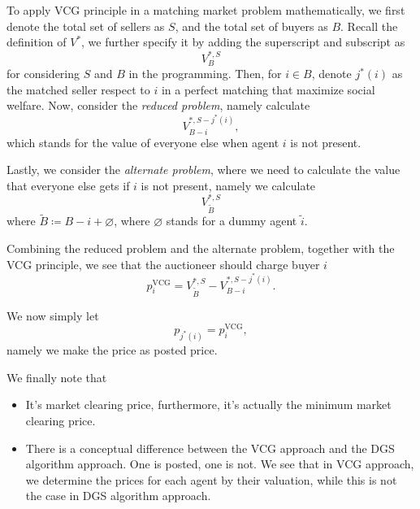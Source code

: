 To apply VCG principle in a matching market problem mathematically, we first denote the total set of sellers as \(S\), and the total set of buyers as \(B\). Recall
the definition of \(V^{\ast}\), we further specify it by adding the superscript and subscript as
\[
	V^{*, S}_{B}
\]
for considering \(S\) and \(B\) in the programming. Then, for \(i\in B\), denote \(j^{\ast} (i)\) as the matched seller respect to \(i\) in a perfect matching that
maximize social welfare. Now, consider the \emph{reduced problem}, namely calculate
\[
	V^{*, S-j^{\ast}(i)}_{B-i},
\]
which stands for the value of everyone else when agent \(i\) is not present.

Lastly, we consider the \emph{alternate problem}, where we need to calculate the value that everyone else gets if \(i\) is not present, namely we
calculate
\[
	V^{*, S}_{\widetilde{B}}
\]
where \(\widetilde{B} \coloneqq B - i + \varnothing \), where \(\varnothing \) stands for a dummy agent \(\widetilde{i} \).

Combining the reduced problem and the alternate problem, together with the VCG principle, we see that the auctioneer should charge buyer \(i\)
\[
	p_{i}^\mathrm{VCG} = V_{\widetilde{B} }^{*, S} - V_{B-i}^{*, S-j^{\ast} (i)}.
\]

We now simply let
\[
	p_{j^{\ast} (i)} = p_{i}^\mathrm{VCG},
\]
namely we make the price as posted price.

\begin{remark}
	We finally note that
	\begin{itemize}
		\item It's market clearing price, furthermore, it's actually the minimum market clearing price.
		\item There is a conceptual difference between the VCG approach and the DGS algorithm approach. One is posted, one is not. We see that in VCG approach, we determine
		      the prices for each agent by their valuation, while this is not the case in DGS algorithm approach.
	\end{itemize}
\end{remark}
